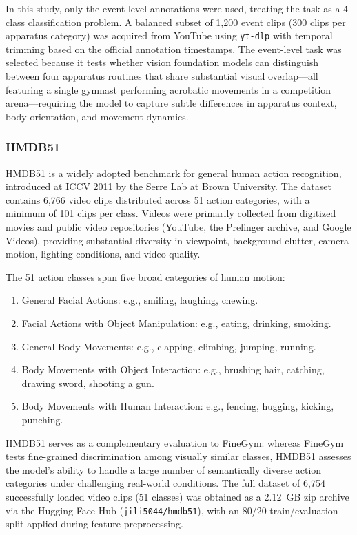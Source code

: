 In this study, only the event-level annotations were used, treating the task as a 4-class classification problem. A balanced subset of 1,200 event clips (300 clips per apparatus category) was acquired from YouTube using \texttt{yt-dlp} with temporal trimming based on the official annotation timestamps. The event-level task was selected because it tests whether vision foundation models can distinguish between four apparatus routines that share substantial visual overlap---all featuring a single gymnast performing acrobatic movements in a competition arena---requiring the model to capture subtle differences in apparatus context, body orientation, and movement dynamics.

\subsubsection{HMDB51}

HMDB51 \citep{kuehne2011hmdb} is a widely adopted benchmark for general human action recognition, introduced at ICCV 2011 by the Serre Lab at Brown University. The dataset contains 6,766 video clips distributed across 51 action categories, with a minimum of 101 clips per class. Videos were primarily collected from digitized movies and public video repositories (YouTube, the Prelinger archive, and Google Videos), providing substantial diversity in viewpoint, background clutter, camera motion, lighting conditions, and video quality.

The 51 action classes span five broad categories of human motion:
\begin{enumerate}[leftmargin=*]
    \item General Facial Actions: e.g., smiling, laughing, chewing.
    \item Facial Actions with Object Manipulation: e.g., eating, drinking, smoking.
    \item General Body Movements: e.g., clapping, climbing, jumping, running.
    \item Body Movements with Object Interaction: e.g., brushing hair, catching, drawing sword, shooting a gun.
    \item Body Movements with Human Interaction: e.g., fencing, hugging, kicking, punching.
\end{enumerate}

HMDB51 serves as a complementary evaluation to FineGym: whereas FineGym tests fine-grained discrimination among visually similar classes, HMDB51 assesses the model's ability to handle a large number of semantically diverse action categories under challenging real-world conditions. The full dataset of 6,754 successfully loaded video clips (51 classes) was obtained as a 2.12~GB zip archive via the Hugging Face Hub (\texttt{jili5044/hmdb51}), with an 80/20 train/evaluation split applied during feature preprocessing.

